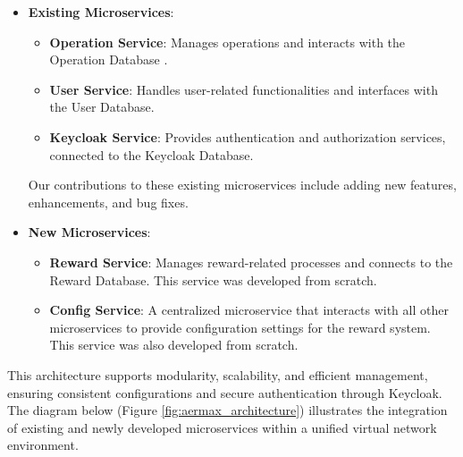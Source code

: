 \begin{itemize}
    \item \textbf{Existing Microservices}:
    \begin{itemize}
        \item \textbf{Operation Service}: Manages operations and interacts with the Operation Database .
        \item \textbf{User Service}: Handles user-related functionalities and interfaces with the User Database.
        \item \textbf{Keycloak Service}: Provides authentication and authorization services, connected to the Keycloak Database.
    \end{itemize}
    Our contributions to these existing microservices include adding new features, enhancements, and bug fixes.
    \item \textbf{New Microservices}:
    \begin{itemize}
        \item \textbf{Reward Service}: Manages reward-related processes and connects to the Reward Database. This service was developed from scratch.
        \item \textbf{Config Service}: A centralized microservice that interacts with all other microservices to provide configuration settings for the reward system. This service was also developed from scratch.
    \end{itemize}
\end{itemize}

This architecture supports modularity, scalability, and efficient management, ensuring consistent configurations and secure authentication through Keycloak. The diagram below (Figure \ref{fig:aermax_architecture}) illustrates the integration of existing and newly developed microservices within a unified virtual network environment.

